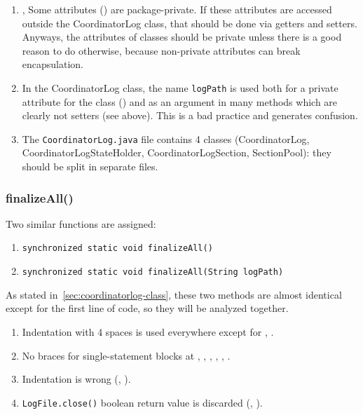 \begin{enumerate}
    \item {},  Some attributes () are package-private. If these attributes are accessed outside the CoordinatorLog class, that should be done via getters and setters. Anyways, the attributes of classes should be private unless there is a good reason to do otherwise, because non-private attributes can break encapsulation.
    \item In the CoordinatorLog class, the name \texttt{logPath} is used both for a private attribute for the class () and as an argument in many methods which are clearly not setters (see above). This is a bad practice and generates confusion.
    \item The \texttt{CoordinatorLog.java} file contains 4 classes (CoordinatorLog, CoordinatorLogStateHolder, CoordinatorLogSection, SectionPool): they should be split in separate files.
\end{enumerate}
\subsubsection{finalizeAll()}
Two similar functions are assigned:
\begin{enumerate}
    \item \texttt{\footnotesize synchronized static void finalizeAll()}
    \item \texttt{\footnotesize synchronized static void finalizeAll(String logPath)}
\end{enumerate}

As stated in~\autoref{sec:coordinatorlog-class}, these two methods are almost identical except for the first line of code, so they will be analyzed together.

\begin{enumerate}
    \item {} Indentation with 4 spaces is used everywhere except for , .
    \item {} No braces for single-statement blocks at , , , , , .
    \item {} Indentation is wrong (, ).
    \item {} \texttt{LogFile.close()} boolean return value is discarded (, ).
\end{enumerate}

